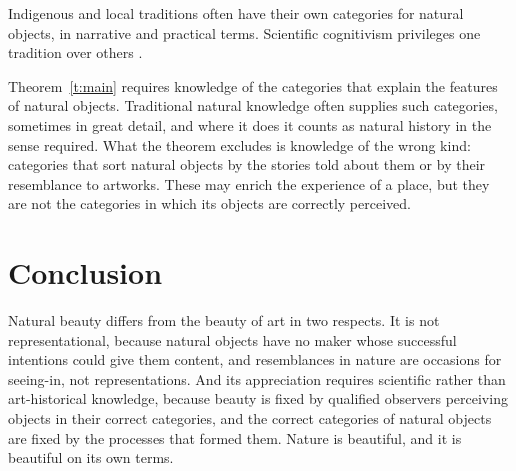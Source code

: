 \documentclass{situationist-preprint}
\begin{document}
\begin{objection}\label{o:folk}
Indigenous and local traditions often have their own categories for natural objects, in narrative and practical terms. Scientific cognitivism privileges one tradition over others \citep{Saito1998}.
\end{objection}

\begin{reply}
Theorem~\ref{t:main} requires knowledge of the categories that explain the features of natural objects. Traditional natural knowledge often supplies such categories, sometimes in great detail, and where it does it counts as natural history in the sense required. What the theorem excludes is knowledge of the wrong kind: categories that sort natural objects by the stories told about them or by their resemblance to artworks. These may enrich the experience of a place, but they are not the categories in which its objects are correctly perceived.
\end{reply}

\section{Conclusion}

Natural beauty differs from the beauty of art in two respects. It is not representational, because natural objects have no maker whose successful intentions could give them content, and resemblances in nature are occasions for seeing-in, not representations. And its appreciation requires scientific rather than art-historical knowledge, because beauty is fixed by qualified observers perceiving objects in their correct categories, and the correct categories of natural objects are fixed by the processes that formed them. Nature is beautiful, and it is beautiful on its own terms.
\end{document}
